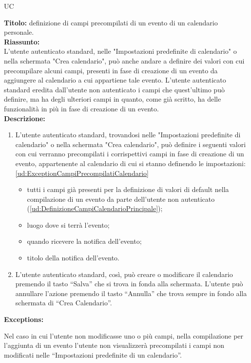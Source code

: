 \begin{listaPersonale}{UC}
\begin{listaPersonale2}[UC] {}
            \newpage
            \textbf{Titolo: } definizione di campi precompilati di un evento di un calendario personale. \\
            \textbf{Riassunto: } \\ L'utente autenticato standard, nelle "Impostazioni predefinite di calendario" o nella schermata "Crea calendario", può anche andare a definire dei valori con cui precompilare alcuni campi, presenti in fase di creazione di un evento da aggiungere al calendario a cui appartiene tale evento. L'utente autenticato standard eredita dall'utente non autenticato i campi che quest'ultimo può definire, ma ha degli ulteriori campi in quanto, come già scritto, ha delle funzionalità in più in fase di creazione di un evento. \\
            \textbf{Descrizione: } \\
            \begin {enumerate}
        \item L'utente autenticato standard, trovandosi nelle "Impostazioni predefinite di calendario" o nella schermata "Crea calendario", può definire i seguenti valori con cui verranno precompilati i corrispettivi campi in fase di creazione di un evento, appartenente al calendario di cui si stanno definendo le impostazioni: \ref{ud:ExceptionCampiPrecompilatiCalendario}
              \begin{itemize}
                  \item tutti i campi già presenti per la definizione di valori di default nella compilazione di un evento da parte dell'utente non autenticato (\ref{ud:DefinizioneCampiCalendarioPrincipale});
                  \item luogo dove si terrà l'evento;
                  \item quando ricevere la notifica dell'evento;
                  \item titolo della notifica dell'evento.
              \end{itemize}
        \item L'utente autenticato standard, così, può creare o modificare il calendario premendo il tasto “Salva” che si trova in fonda alla schermata. L'utente può annullare l'azione premendo il tasto “Annulla” che trova sempre in fondo alla schermata di “Crea Calendario”.
              \end{enumerate}
              \textbf{Exceptions:}
              \begin{enumerate}[label=\textbf{[exception \arabic{enumiii}]}, ref= \textbf{[exception \arabic{enumiii}]}]
                   Nel caso in cui l'utente non modificasse uno o più campi, nella compilazione per l'aggiunta di un evento l'utente non visualizzerà precompilati i campi non modificati nelle “Impostazioni predefinite di un calendario”.
              \end{enumerate}





\end{listaPersonale2}
\end{listaPersonale}
